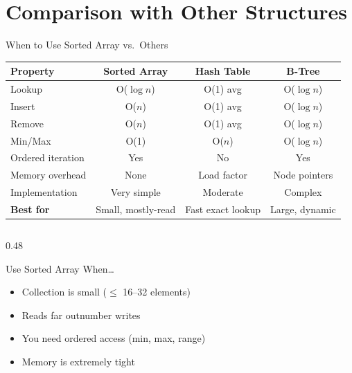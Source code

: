 \documentclass[aspectratio=169, 10pt]{beamer}
\begin{document}
\section{Comparison with Other Structures}

\begin{frame}{When to Use Sorted Array vs.\ Others}
\begin{table}
\centering
\small
\begin{tabular}{@{}lccc@{}}
\toprule
\textbf{Property} & \textbf{Sorted Array} & \textbf{Hash Table} & \textbf{B-Tree} \\
\midrule
Lookup           & O($\log n$)    & O(1) avg     & O($\log n$) \\
Insert           & O($n$)         & O(1) avg     & O($\log n$) \\
Remove           & O($n$)         & O(1) avg     & O($\log n$) \\
Min/Max          & O(1)           & O($n$)       & O($\log n$) \\
Ordered iteration & Yes           & No           & Yes \\
Memory overhead  & None           & Load factor  & Node pointers \\
Implementation   & Very simple    & Moderate     & Complex \\
\midrule
\textbf{Best for} & Small, mostly-read & Fast exact lookup & Large, dynamic \\
\bottomrule
\end{tabular}
\end{table}

\vspace{0.5em}
\begin{columns}[T]
\begin{column}{0.48\textwidth}
\begin{block}{Use Sorted Array When\ldots}
\begin{itemize}
  \item Collection is small ($\leq$ 16--32 elements)
  \item Reads far outnumber writes
  \item You need ordered access (min, max, range)
  \item Memory is extremely tight
\end{itemize}
\end{block}
\end{column}


\end{columns}
\end{frame}
\end{document}
